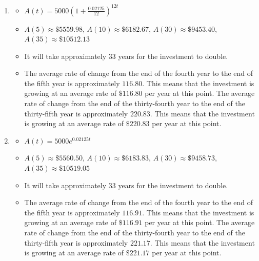\documentclass{ximera}
\begin{document}
\begin{enumerate}
\item \begin{itemize}  \item $A(t) = 5000\left(1 + \frac{0.02125}{12}\right)^{12t}$ 

\item $A(5) \approx \$ 5559.98$, $A(10) \approx \$ 6182.67$, $A(30) \approx \$ 9453.40$, $A(35) \approx \$ 10512.13$ 

\item  It will take approximately $33$ years for the investment to double.

\item  The average rate of change from the end of the fourth year to the end of the fifth year is approximately $116.80$.  This means that the investment is growing at an average rate of $\$116.80$ per year at this point.  The average rate of change from the end of the thirty-fourth year to the end of the thirty-fifth year is approximately $220.83$.  This means that the investment is growing at an average rate of $\$220.83$ per year at this point. 

\end{itemize}

\item \begin{itemize}  \item $A(t) = 5000e^{0.02125t}$ 

\item $A(5) \approx \$ 5560.50$, $A(10) \approx \$ 6183.83$, $A(30) \approx \$ 9458.73$, $A(35) \approx \$ 10519.05$ 

\item  It will take approximately $33$ years for the investment to double.

\item  The average rate of change from the end of the fourth year to the end of the fifth year is approximately $116.91$.  This means that the investment is growing at an average rate of $\$116.91$ per year at this point.  The average rate of change from the end of the thirty-fourth year to the end of the thirty-fifth year is approximately $221.17$.  This means that the investment is growing at an average rate of $\$221.17$ per year at this point. 

\end{itemize}

\setcounter{HW}{\value{enumi}}
\end{enumerate}
\end{document}
